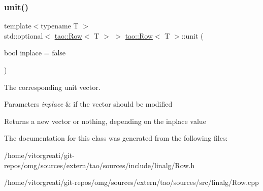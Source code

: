 \subsubsection{\texorpdfstring{unit()}{unit()}}
{\footnotesize\ttfamily template$<$typename T $>$ \\
std\+::optional$<$ \mbox{\hyperlink{classtao_1_1_row}{tao\+::\+Row}}$<$ T $>$ $>$ \mbox{\hyperlink{classtao_1_1_row}{tao\+::\+Row}}$<$ T $>$\+::unit (\begin{DoxyParamCaption}\item[{bool}]{inplace = {\ttfamily false} }\end{DoxyParamCaption})}



The corresponding unit vector. 


\begin{DoxyParams}{Parameters}
{\em inplace} & if the vector should be modified \\
\hline
\end{DoxyParams}
\begin{DoxyReturn}{Returns}
a new vector or nothing, depending on the inplace value 
\end{DoxyReturn}


The documentation for this class was generated from the following files\+:\begin{DoxyCompactItemize}
\item 
/home/vitorgreati/git-\/repos/omg/sources/extern/tao/sources/include/linalg/Row.\+h\item 
/home/vitorgreati/git-\/repos/omg/sources/extern/tao/sources/src/linalg/Row.\+cpp\end{DoxyCompactItemize}
